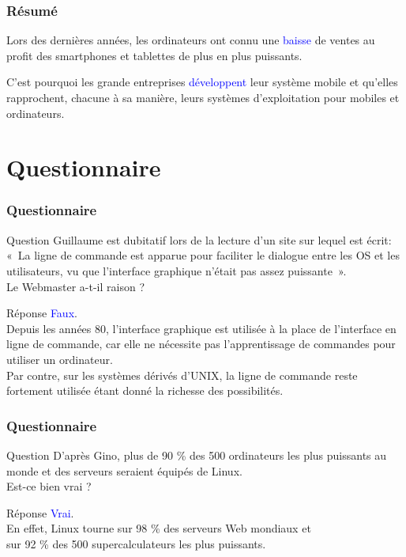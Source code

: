 \documentclass[aspectratio=169]{beamer}
\begin{document}
\begin{frame}
  \frametitle{Résumé}
  Lors des dernières années, les ordinateurs ont connu une
  \textcolor{blue}{baisse} de ventes au profit des smartphones et tablettes de
  plus en plus puissants.

  \hspace{0.5cm}

  C'est pourquoi les grande entreprises \textcolor{blue}{développent} leur
  système mobile et qu'elles rapprochent, chacune à sa manière, leurs systèmes
  d'exploitation pour mobiles et ordinateurs.
\end{frame}

\section{Questionnaire}

\begin{frame}
  \frametitle{Questionnaire}
  \begin{exampleblock}{Question}
    Guillaume est dubitatif lors de la lecture d’un site sur lequel est écrit: \\
    « La ligne de commande est apparue pour faciliter le dialogue entre les OS
    et les utilisateurs, vu que l’interface graphique n’était pas assez
    puissante ». \\
    Le Webmaster a-t-il raison ?
  \end{exampleblock}

  \pause

  \begin{block}{Réponse}
    \textcolor{blue}{Faux}. \\
    Depuis les années 80, l’interface graphique est utilisée à la place de
    l’interface en ligne de commande, car elle ne nécessite pas l'apprentissage
    de commandes pour utiliser un ordinateur.\\
    Par contre, sur les systèmes dérivés d’UNIX, la ligne de commande reste
    fortement utilisée étant donné la richesse des possibilités.
  \end{block}
\end{frame}

\begin{frame}
  \frametitle{Questionnaire}
  \begin{exampleblock}{Question}
    D’après Gino, plus de 90 \% des 500 ordinateurs les plus puissants au monde
    et des serveurs seraient équipés de Linux. \\
    Est-ce bien vrai ?
  \end{exampleblock}

  \pause

  \begin{block}{Réponse}
    \textcolor{blue}{Vrai}. \\
    En effet, Linux tourne sur 98 \% des serveurs Web mondiaux et \\
    sur 92 \% des 500 supercalculateurs les plus puissants.
  \end{block}
\end{frame}
\end{document}
